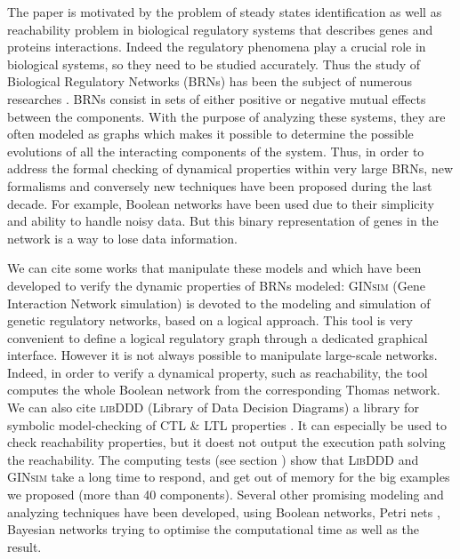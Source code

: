The paper is motivated by the problem of steady states identification as well as reachability problem in biological regulatory systems that describes genes and proteins interactions. Indeed the regulatory phenomena play a crucial role in biological systems, so they need to be studied accurately. Thus the study of Biological Regulatory Networks (BRNs) has been the subject of numerous researches \cite{thieffry1999modularity, shermin20092, rauf2011formal}. BRNs consist in sets of either positive or negative mutual effects between the components. With the purpose of analyzing these systems, they are often modeled as graphs which makes it possible to determine the possible evolutions of all the interacting components of the system. Thus, in order to address the formal checking of dynamical properties within very large BRNs, new formalisms and conversely new techniques have been proposed during the last decade. For example, Boolean networks \cite{stuart1993origins, kauffman1969metabolic} have been used due to their simplicity and ability to handle noisy data. But this binary representation of genes in the network is a way to lose data information. %

We can cite some works that manipulate these models and which have been developed to verify the dynamic properties of BRNs modeled: \textsc{GINsim} (Gene Interaction Network simulation) \cite{chaouiya2012logical, gonzalez2006ginsim} is devoted to the modeling and simulation of genetic regulatory networks, based on a logical approach. This tool is very convenient  to define a logical regulatory graph through a dedicated graphical interface. However it is not always possible to manipulate large-scale networks. Indeed, in order to verify a dynamical property, such as reachability, the tool computes the whole Boolean network from the corresponding Thomas network.
We can also cite \textsc{libDDD} (Library of Data Decision Diagrams) a library for symbolic model-checking of CTL \& LTL properties \cite{libddd, Kordon09libddd}. It can especially be used to check reachability properties, but it doest not output the execution path solving the reachability. The computing tests (see section ) show that \textsc{LibDDD} and \textsc{GINsim} take a long time to respond, and get out of memory for the big examples we proposed (more than 40 components).  %
Several other promising modeling and analyzing techniques have been developed, using Boolean networks, Petri nets \cite{heljanko2001answer}, Bayesian networks \cite{numata2008partial} trying to optimise the computational time as well as the result. %

